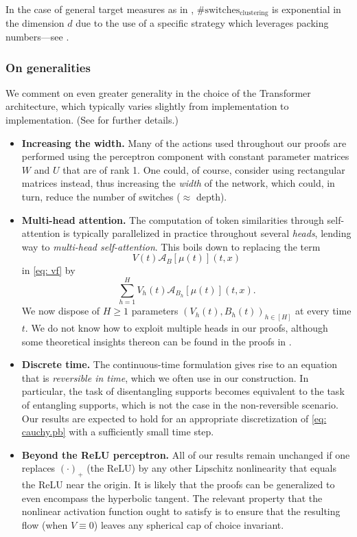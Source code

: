 \documentclass[a4paper,11pt]{article}
\theoremstyle{plain}
\newcommand{\bW}{\bm{\mathit{W}}}
\newcommand{\bV}{\bm{\mathit{V}}}
\newcommand{\bB}{\bm{\mathit{B}}}
\newcommand{\bU}{\bm{\mathit{U}}}
\renewcommand{\geq}{\geqslant}
\numberwithin{equation}{section}
\begin{document}
In the case of general target measures as in , $\#\text{switches}_{\text{clustering}}$ is exponential in the dimension $d$ due to the use of a specific strategy which leverages packing numbers---see . 





\subsubsection{On generalities}
We comment on even greater generality in the choice of the Transformer architecture, which typically varies slightly from implementation to implementation. (See {\bf {}} for further details.)

\begin{itemize}
    \item {\bf Increasing the width.} Many of the actions used throughout our proofs are performed using the perceptron component with constant parameter matrices $\bW$ and $\bU$ that are of rank 1. One could, of course, consider using rectangular matrices instead, thus increasing the \emph{width} of the network, which could, in turn, reduce the number of switches ($\approx$ depth).
    
    \item {\bf Multi-head attention.} The computation of token similarities through self-attention is typically parallelized in practice throughout several \emph{heads}, lending way to \emph{multi-head self-attention}. This boils down to replacing the term 
    $$\bV(t)\mathscr{A}_{\bB}[\mu(t)](t,x)$$ 
    in \eqref{eq: vf} by
    \begin{equation*}
        \sum_{h=1}^H \bV_h(t)\mathscr{A}_{\bB_h}[\mu(t)](t,x).
    \end{equation*}
    We now dispose of $H\geq1$ parameters $(\bV_h(t),\bB_h(t))_{h\in[H]}$ at every time $t$. We do not know how to exploit multiple heads in our proofs, although some theoretical insights thereon can be found in the proofs in \cite{chen2024provably}.

    \item  {\bf Discrete time.} The continuous-time formulation gives rise to an equation that is \emph{reversible in time}, which we often use in our construction. In particular, the task of disentangling supports becomes equivalent to the task of entangling supports, which is not the case in the non-reversible scenario. Our results are expected to hold for an appropriate discretization of \eqref{eq: cauchy.pb} with a sufficiently small time step.

    \item {\bf Beyond the ReLU perceptron.} All of our results remain unchanged if one replaces $(\cdot)_+$ (the ReLU) by any other Lipschitz nonlinearity that equals the ReLU near the origin. It is likely that the proofs can be generalized to even encompass the hyperbolic tangent. The relevant property that the nonlinear activation function ought to satisfy is to ensure that the resulting  flow (when $\bV\equiv0$) leaves any spherical cap of choice invariant. 
\end{itemize}
\end{document}
